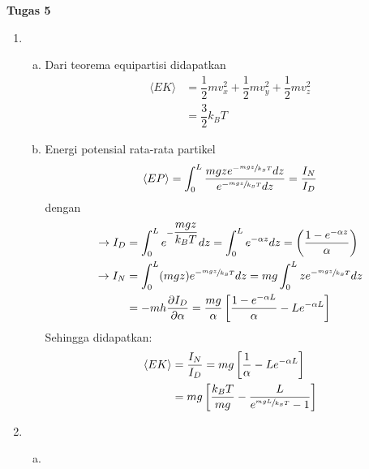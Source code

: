 \textbf{Tugas 5}
\begin{enumerate}
    \item 
    \begin{enumerate}[(a)]
        \item Dari teorema equipartisi didapatkan
        \begin{equation*}
            \begin{split}
                \langle EK \rangle&=\dfrac{1}{2}mv_x ^2+\dfrac{1}{2}mv_y ^2+\dfrac{1}{2}mv_z ^2\\
                &=\dfrac{3}{2}k_BT
            \end{split}
        \end{equation*}
        \item Energi potensial rata-rata partikel
        \begin{equation*}
            \langle EP \rangle =\int_0^L\dfrac{mgze^{-\sfrac{mgz}{k_BT}}dz}{e^{-\sfrac{mgz}{k_BT}}dz}=\dfrac{I_N}{I_D}
        \end{equation*}
        dengan
        \begin{equation*}
            \begin{split}
                \rightarrow I_D&=\int_0^L e^{-\dfrac{mgz}{k_BT}}dz=\int_0^L e^{-\alpha z}dz=\left(\dfrac{1-e^{-\alpha z}}{\alpha}\right)\\
                \rightarrow I_N&=\int_0^L (mgz)e^{-\sfrac{mgz}{k_BT}}dz=mg\int_0^L ze^{-\sfrac{mgz}{k_BT}}dz\\
                &=-mh\dfrac{\partial I_D}{\partial \alpha}=\dfrac{mg}{\alpha}\left[\dfrac{1-e^{-\alpha L}}{\alpha}-Le^{-\alpha L}\right]
            \end{split}
        \end{equation*}
        Sehingga didapatkan:
        \begin{equation*}
            \begin{split}
                \langle EK \rangle&=\dfrac{I_N}{I_D}=mg\left[\dfrac{1}{\alpha}-Le^{-\alpha L}\right]\\
                &=mg\left[\dfrac{k_BT}{mg}-
                \dfrac{L}{e^{\sfrac{mgL}{k_BT}}-1}\right]
            \end{split}
        \end{equation*}
    \end{enumerate}
    \item 
    \begin{enumerate}[(a)]
        \item 
            \begin{equation*}

\end{equation*}
\end{enumerate}
\end{enumerate}
